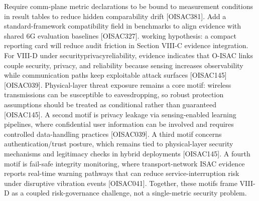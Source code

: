 \markdownRendererUlItem Require comm-plane metric declarations to be bound to measurement conditions in result tables to reduce hidden comparability drift [O\markdownRendererUnderscore{}ISAC\markdownRendererUnderscore{}381].\markdownRendererUlItemEnd 
\markdownRendererUlItem Add a standard-framework compatibility field in benchmarks to align evidence with shared 6G evaluation baselines [O\markdownRendererUnderscore{}ISAC\markdownRendererUnderscore{}327].\markdownRendererUlItemEnd 
\markdownRendererUlItem working hypothesis: a compact reporting card will reduce audit friction in Section VIII-C evidence integration.\markdownRendererUlItemEnd 
\markdownRendererUlEndTight \markdownRendererInterblockSeparator
{}
\markdownRendererSectionEnd 
\markdownRendererSectionEnd \markdownRendererSectionBegin
{}\markdownRendererInterblockSeparator
{}\markdownRendererSectionBegin
{}\markdownRendererInterblockSeparator
{}For VIII-D under security\markdownRendererUnderscore{}privacy\markdownRendererUnderscore{}reliability, evidence indicates that O-ISAC links couple security, privacy, and reliability because sensing increases observability while communication paths keep exploitable attack surfaces [O\markdownRendererUnderscore{}ISAC\markdownRendererUnderscore{}145][O\markdownRendererUnderscore{}ISAC\markdownRendererUnderscore{}039]. Physical-layer threat exposure remains a core motif: wireless transmissions can be susceptible to eavesdropping, so robust protection assumptions should be treated as conditional rather than guaranteed [O\markdownRendererUnderscore{}ISAC\markdownRendererUnderscore{}145]. A second motif is privacy leakage via sensing-enabled learning pipelines, where confidential user information can be involved and requires controlled data-handling practices [O\markdownRendererUnderscore{}ISAC\markdownRendererUnderscore{}039]. A third motif concerns authentication/trust posture, which remains tied to physical-layer security mechanisms and legitimacy checks in hybrid deployments [O\markdownRendererUnderscore{}ISAC\markdownRendererUnderscore{}145]. A fourth motif is fail-safe integrity monitoring, where transport-network ISAC evidence reports real-time warning pathways that can reduce service-interruption risk under disruptive vibration events [O\markdownRendererUnderscore{}ISAC\markdownRendererUnderscore{}041]. Together, these motifs frame VIII-D as a coupled risk-governance challenge, not a single-metric security problem.\markdownRendererInterblockSeparator
